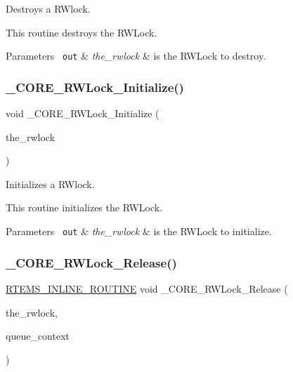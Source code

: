Destroys a R\+Wlock. 

This routine destroys the R\+W\+Lock.


\begin{DoxyParams}[1]{Parameters}
\mbox{\texttt{ out}}  & {\em the\+\_\+rwlock} & is the R\+W\+Lock to destroy. \\
\hline
\end{DoxyParams}
\mbox{\label{group__RTEMSScoreRWLock_gaa689b4e53215c2f2c0a19f25d531aafb}} 
\subsubsection{\texorpdfstring{\_CORE\_RWLock\_Initialize()}{\_CORE\_RWLock\_Initialize()}}
{\footnotesize\ttfamily void \+\_\+\+C\+O\+R\+E\+\_\+\+R\+W\+Lock\+\_\+\+Initialize (\begin{DoxyParamCaption}\item[{\mbox{\hyperlink{structCORE__RWLock__Control}{C\+O\+R\+E\+\_\+\+R\+W\+Lock\+\_\+\+Control}} $\ast$}]{the\+\_\+rwlock }\end{DoxyParamCaption})}



Initializes a R\+Wlock. 

This routine initializes the R\+W\+Lock.


\begin{DoxyParams}[1]{Parameters}
\mbox{\texttt{ out}}  & {\em the\+\_\+rwlock} & is the R\+W\+Lock to initialize. \\
\hline
\end{DoxyParams}
\mbox{\label{group__RTEMSScoreRWLock_ga0441e1bfb6a1316cbf35dccf40dbf920}} 
\subsubsection{\texorpdfstring{\_CORE\_RWLock\_Release()}{\_CORE\_RWLock\_Release()}}
{\footnotesize\ttfamily \mbox{\hyperlink{group__RTEMSScoreBaseDefs_gac216239df231d5dbd15e3520b0b9313f}{R\+T\+E\+M\+S\+\_\+\+I\+N\+L\+I\+N\+E\+\_\+\+R\+O\+U\+T\+I\+NE}} void \+\_\+\+C\+O\+R\+E\+\_\+\+R\+W\+Lock\+\_\+\+Release (\begin{DoxyParamCaption}\item[{\mbox{\hyperlink{structCORE__RWLock__Control}{C\+O\+R\+E\+\_\+\+R\+W\+Lock\+\_\+\+Control}} $\ast$}]{the\+\_\+rwlock,  }\item[{\mbox{\hyperlink{structThread__queue__Context}{Thread\+\_\+queue\+\_\+\+Context}} $\ast$}]{queue\+\_\+context }\end{DoxyParamCaption})}



